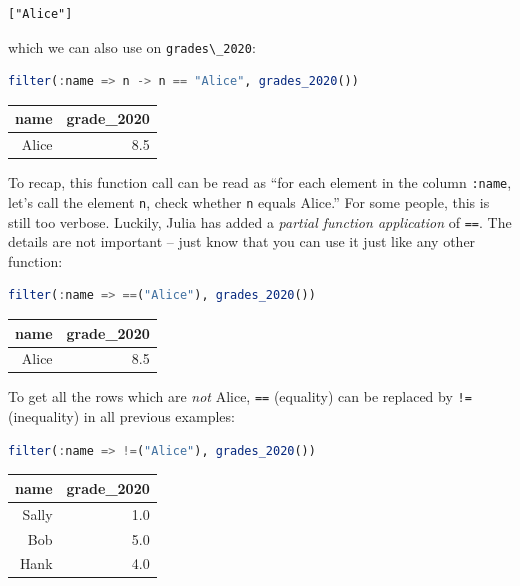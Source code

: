 \documentclass[
  notoc %
]{tufte-book}
\newcommand{\passthrough}[1]{#1}
\begin{document}
\begin{lstlisting}[language=Output]
["Alice"]
\end{lstlisting}

which we can also use on \passthrough{\lstinline!grades\_2020!}:

\begin{lstlisting}[language=Julia]
filter(:name => n -> n == "Alice", grades_2020())
\end{lstlisting}

\begin{longtable}[]{@{}rr@{}}
\toprule
name & grade\_2020 \\
\midrule
\endhead
Alice & 8.5 \\
\bottomrule
\end{longtable}

To recap, this function call can be read as ``for each element in the
column \passthrough{\lstinline!:name!}, let's call the element
\passthrough{\lstinline!n!}, check whether \passthrough{\lstinline!n!}
equals Alice.'' For some people, this is still too verbose. Luckily,
Julia has added a \emph{partial function application} of
\passthrough{\lstinline!==!}. The details are not important -- just know
that you can use it just like any other function:

\begin{lstlisting}[language=Julia]
filter(:name => ==("Alice"), grades_2020())
\end{lstlisting}

\begin{longtable}[]{@{}rr@{}}
\toprule
name & grade\_2020 \\
\midrule
\endhead
Alice & 8.5 \\
\bottomrule
\end{longtable}

To get all the rows which are \emph{not} Alice,
\passthrough{\lstinline!==!} (equality) can be replaced by
\passthrough{\lstinline"!="} (inequality) in all previous examples:

\begin{lstlisting}[language=Julia]
filter(:name => !=("Alice"), grades_2020())
\end{lstlisting}

\begin{longtable}[]{@{}rr@{}}
\toprule
name & grade\_2020 \\
\midrule
\endhead
Sally & 1.0 \\
Bob & 5.0 \\
Hank & 4.0 \\
\bottomrule
\end{longtable}
\end{document}
